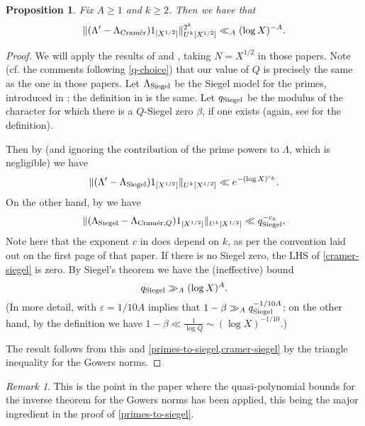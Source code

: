 \documentclass[11pt,reqno]{amsart}
\numberwithin{equation}{section}
\newtheorem{proposition}[theorem]{Proposition}
\theoremstyle{definition}
\theoremstyle{remark}
\newtheorem*{remark}{Remark}
\newcommand{\snorm}[1]{\lVert#1\rVert}
\newcommand{\eps}{\varepsilon}
\renewcommand{\ge}{\geqslant}
\newcommand\siegel{{\textnormal{Siegel}}}
\newcommand\cramer{{\textnormal{Cram\'er}}}
\begin{document}
\begin{proposition}\label{prop:primes-gowers-uniform}
Fix $A\ge 1$ and $k\ge 2$.  Then we have that 
\[\snorm{(\Lambda' - \Lambda_{\cramer})1_{[X^{1/2}]}}_{U^k[X^{1/2}]}^{2^k}\ll_{A} (\log X)^{-A}.\]
\end{proposition}
\begin{proof}
We will apply the results of \cite{TT21} and \cite[Section 5]{Len23b}, taking $N = X^{1/2}$ in those papers. Note (cf. the comments following \cref{q-choice}) that our value of $Q$ is precisely the same as the one in those papers. Let $\Lambda_{\siegel}$ be the Siegel model for the primes, introduced in \cite[Definition 2.1]{TT21}; the definition in \cite[Section 5]{Len23b} is the same. Let $q_{\siegel}$ be the modulus of the character for which there is a $Q$-Siegel zero $\beta$, if one exists (again, see \cite[Definition 2.1]{TT21} for the definition).

Then by \cite[Theorem 7]{Len23b} (and ignoring the contribution of the prime powers to $\Lambda$, which is negligible) we have
\begin{equation}\label{primes-to-siegel} \Vert (\Lambda' - \Lambda_{\siegel})1_{[X^{1/2}]} \Vert_{U^k[X^{1/2}]} \ll e^{-(\log X)^{c_k}}.\end{equation}
On the other hand, by \cite[Theorem 2.5]{TT21} we have 
\begin{equation}\label{cramer-siegel} \Vert ( \Lambda_{\siegel} - \Lambda_{\cramer, Q})1_{[X^{1/2}]} \Vert_{U^k[X^{1/2}]} \ll q_{\siegel}^{-c_k} , \end{equation} Note here that the exponent $c$ in \cite[Theorem 2.5]{TT21} does depend on $k$, as per the convention laid out on the first page of that paper. If there is no Siegel zero, the LHS of \cref{cramer-siegel} is zero. By Siegel's theorem we have the (ineffective) bound
\begin{equation}\label{sig-bd} q_{\siegel} \gg_A (\log X)^A.\end{equation}
(In more detail, \cite[Theorem~5.28 (2)]{IK-book} with $\eps = 1/10A$ implies that $1 - \beta \gg_A q_{\siegel}^{-1/10A}$; on the other hand, by the definition \cite[Definition 2.1]{TT21} we have $1 - \beta \ll \frac{1}{\log Q} \sim (\log X)^{-1/10}$.)


The result follows from this and \cref{primes-to-siegel,cramer-siegel} by the triangle inequality for the Gowers norms.
\end{proof}
\begin{remark}
This is the point in the paper where the quasi-polynomial bounds for the inverse theorem for the Gowers norms \cite{LSS} has been applied, this being the major ingredient in the proof of \cref{primes-to-siegel}.
\end{remark}
\end{document}
